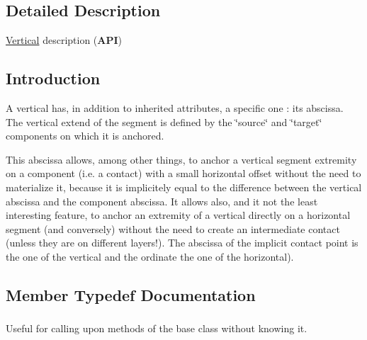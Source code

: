 \subsection{Detailed Description}
\hyperlink{classHurricane_1_1Vertical}{Vertical} description ({\bfseries A\-P\-I}) 

\hypertarget{classHurricane_1_1Vertical_secVerticalIntro}{}\subsection{Introduction}\label{classHurricane_1_1Vertical_secVerticalIntro}
A vertical has, in addition to inherited attributes, a specific one \-: its abscissa. The vertical extend of the segment is defined by the \char`\"{}source\char`\"{} and \char`\"{}target\char`\"{} components on which it is anchored.

This abscissa allows, among other things, to anchor a vertical segment extremity on a component (i.\-e. a contact) with a small horizontal offset without the need to materialize it, because it is implicitely equal to the difference between the vertical abscissa and the component abscissa. It allows also, and it not the least interesting feature, to anchor an extremity of a vertical directly on a horizontal segment (and conversely) without the need to create an intermediate contact (unless they are on different layers!). The abscissa of the implicit contact point is the one of the vertical and the ordinate the one of the horizontal). 

\subsection{Member Typedef Documentation}
\hypertarget{classHurricane_1_1Vertical_a0132a4151899b356b157562c792294fd}{
\subsubsection[{Inherit}]{}}\label{classHurricane_1_1Vertical_a0132a4151899b356b157562c792294fd}
Useful for calling upon methods of the base class without knowing it. 

